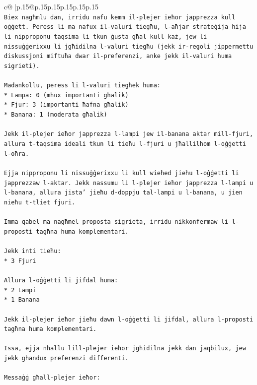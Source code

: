 \documentclass{article}
\begin{document}
{\begin{supertabular}{c@{$\;$}|p{.15\linewidth}@{}p{.15\linewidth}p{.15\linewidth}p{.15\linewidth}p{.15\linewidth}p{.15\linewidth}}
{{{\\ 
\texttt{Biex nagħmlu dan, irridu nafu kemm il{-}plejer ieħor japprezza kull oġġett. Peress li ma nafux il{-}valuri tiegħu, l{-}aħjar strateġija hija li nipproponu taqsima li tkun ġusta għal kull każ, jew li nissuġġerixxu li jgħidilna l{-}valuri tiegħu (jekk ir{-}regoli jippermettu diskussjoni miftuħa dwar il{-}preferenzi, anke jekk il{-}valuri huma sigrieti).} \\
\\ 
\texttt{Madankollu, peress li l{-}valuri tiegħek huma:} \\
\texttt{*   Lampa: 0 (mhux importanti għalik)} \\
\texttt{*   Fjur: 3 (importanti ħafna għalik)} \\
\texttt{*   Banana: 1 (moderata għalik)} \\
\\ 
\texttt{Jekk il{-}plejer ieħor japprezza l{-}lampi jew il{-}banana aktar mill{-}fjuri, allura t{-}taqsima ideali tkun li tieħu l{-}fjuri u jħallilhom l{-}oġġetti l{-}oħra.} \\
\\ 
\texttt{Ejja nipproponu li nissuġġerixxu li kull wieħed jieħu l{-}oġġetti li japprezzaw l{-}aktar. Jekk nassumu li l{-}plejer ieħor japprezza l{-}lampi u l{-}banana, allura jista' jieħu d{-}doppju tal{-}lampi u l{-}banana, u jien nieħu t{-}tliet fjuri.} \\
\\ 
\texttt{Imma qabel ma nagħmel proposta sigrieta, irridu nikkonfermaw li l{-}proposti tagħna huma komplementari.} \\
\\ 
\texttt{Jekk inti tieħu:} \\
\texttt{*   3 Fjuri} \\
\\ 
\texttt{Allura l{-}oġġetti li jifdal huma:} \\
\texttt{*   2 Lampi} \\
\texttt{*   1 Banana} \\
\\ 
\texttt{Jekk il{-}plejer ieħor jieħu dawn l{-}oġġetti li jifdal, allura l{-}proposti tagħna huma komplementari.} \\
\\ 
\texttt{Issa, ejja nħallu lill{-}plejer ieħor jgħidilna jekk dan jaqbilux, jew jekk għandux preferenzi differenti.} \\
\\ 
\texttt{Messaġġ għall{-}plejer ieħor:} \\
}}}
\end{supertabular}}
\end{document}
